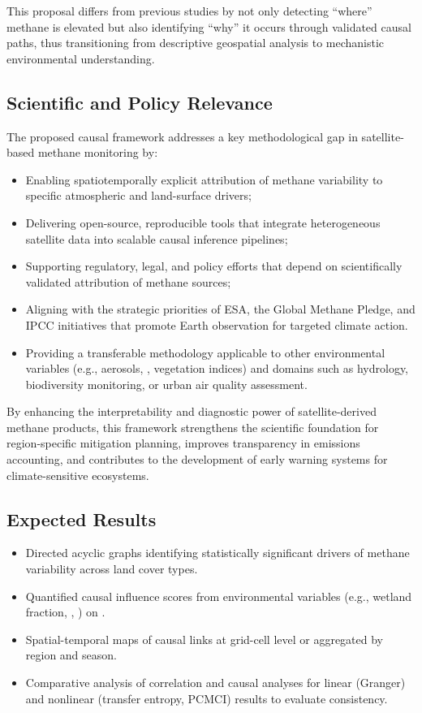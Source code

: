 This proposal differs from previous studies by not only detecting “where” methane is elevated but also identifying “why” it occurs through validated causal paths, thus transitioning from descriptive geospatial analysis to mechanistic environmental understanding.

\subsection{Scientific and Policy Relevance}
\label{subsec:scientific-relevance}

The proposed causal framework addresses a key methodological gap in satellite-based methane monitoring by:
\begin{itemize}
    \item Enabling spatiotemporally explicit attribution of methane variability to specific atmospheric and land-surface drivers;
    \item Delivering open-source, reproducible tools that integrate heterogeneous satellite data into scalable causal inference pipelines;
    \item Supporting regulatory, legal, and policy efforts that depend on scientifically validated attribution of methane sources;
    \item Aligning with the strategic priorities of ESA, the Global Methane Pledge, and IPCC initiatives that promote Earth observation for targeted climate action.
    \item Providing a transferable methodology applicable to other environmental variables (e.g., aerosols, , vegetation indices) and domains such as hydrology, biodiversity monitoring, or urban air quality assessment.

\end{itemize}

By enhancing the interpretability and diagnostic power of satellite-derived methane products, this framework strengthens the scientific foundation for region-specific mitigation planning, improves transparency in emissions accounting, and contributes to the development of early warning systems for climate-sensitive ecosystems.




\subsection{Expected Results}

\begin{itemize}
    \item Directed acyclic graphs identifying statistically significant drivers of methane variability across land cover types.
    \item Quantified causal influence scores from environmental variables (e.g., wetland fraction, , ) on .
    \item Spatial-temporal maps of causal links at grid-cell level or aggregated by region and season.
    \item Comparative analysis of correlation and causal analyses for linear (Granger) and nonlinear (transfer entropy, PCMCI) results to evaluate consistency.
\end{itemize}

